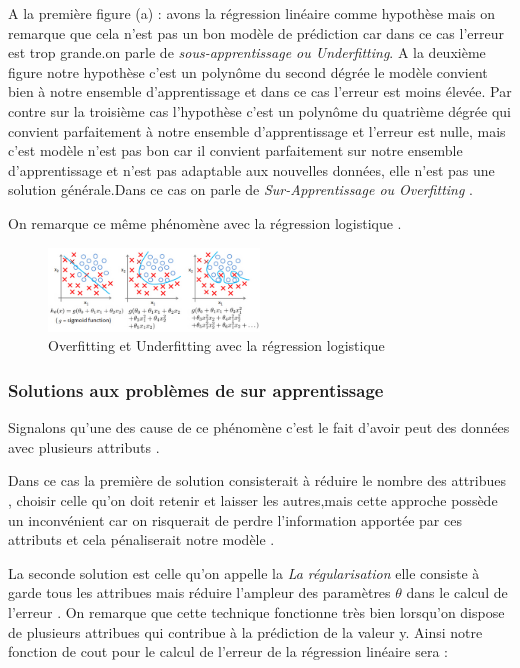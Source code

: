 A la première figure (a) : avons la régression linéaire comme hypothèse  mais on remarque que cela n'est pas un bon modèle de prédiction car dans ce cas l'erreur est trop grande.on parle de \emph{sous-apprentissage ou Underfitting}.
A la deuxième figure notre hypothèse c'est un polynôme du second dégrée le modèle convient bien à notre ensemble d'apprentissage et dans ce cas l'erreur est moins élevée.
Par contre sur la troisième cas l'hypothèse c'est un polynôme du quatrième dégrée qui convient parfaitement à notre ensemble d'apprentissage et l'erreur est nulle, mais c'est modèle n'est pas bon  car il  convient parfaitement sur notre ensemble d'apprentissage et n'est pas adaptable aux nouvelles données, elle n'est pas une solution générale.Dans ce cas on parle de \emph{Sur-Apprentissage ou Overfitting } .

On remarque ce même phénomène avec la régression logistique .

\begin{figure}[ht]
	\centering
	\includegraphics[width=0.5\textwidth]{fig/OverfiittingLogistic.png}
	\caption[Short caption]{Overfitting et Underfitting avec la régression logistique }
	\label{fig:image8}
\end{figure}
\subsubsection{Solutions aux problèmes de sur apprentissage }
Signalons qu'une des cause de ce phénomène c'est le fait d'avoir peut des données avec plusieurs attributs .

Dans ce cas la première de solution consisterait à réduire le nombre des attribues , choisir celle qu'on doit retenir et laisser les autres,mais cette approche possède un inconvénient car on risquerait de perdre l'information apportée par ces attributs et cela pénaliserait notre modèle .

La seconde solution est celle qu'on appelle la \emph{La régularisation } elle consiste à garde tous les attribues mais réduire l'ampleur des paramètres  $\theta$ dans le calcul de l'erreur . On remarque que cette technique fonctionne très bien lorsqu'on dispose de plusieurs attribues qui contribue à la prédiction de la valeur y.
Ainsi notre fonction de cout pour le calcul de l'erreur de la régression linéaire sera :

